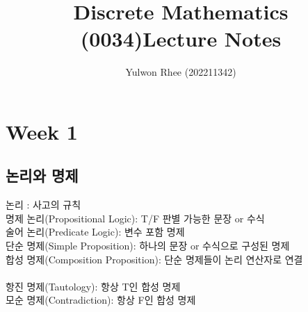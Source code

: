 



\title{Discrete Mathematics (0034)\newline\space Lecture Notes}
\author{Yulwon Rhee (202211342)}

\maketitle
\section{Week 1}
\subsection{논리와 명제}
논리 : 사고의 규칙\\
명제 논리(Propositional Logic): T/F 판별 가능한 문장 or 수식\\
술어 논리(Predicate Logic): 변수 포함 명제\\
단순 명제(Simple Proposition): 하나의 문장 or 수식으로 구성된 명제\\
합성 명제(Composition Proposition): 단순 명제들이 논리 연산자로 연결\\\\
항진 명제(Tautology): 항상 T인 합성 명제\\
모순 명제(Contradiction): 항상 F인 합성 명제\\
